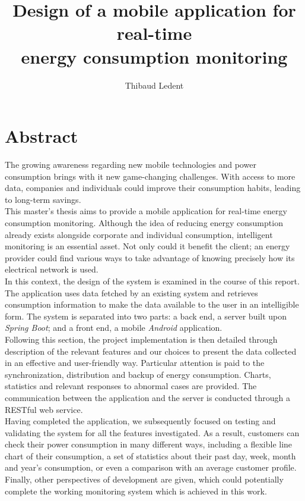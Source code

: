 \documentclass[a4paper, oneside, 11pt]{book}
\title{Design of a mobile application for real-time \\energy consumption monitoring}
\author{Thibaud Ledent}
\begin{document}
\maketitle

\frontmatter

\chapter{Abstract}
The growing awareness regarding new mobile technologies and power consumption brings with it new game-changing challenges. With access to more data, companies and individuals could improve their consumption habits, leading to long-term savings. \\

This master’s thesis aims to provide a mobile application for real-time energy consumption monitoring. Although the idea of reducing energy consumption already exists alongside corporate and individual consumption, intelligent monitoring is an essential asset. Not only could it benefit the client; an energy provider could find various ways to take advantage of knowing precisely how its electrical network is used.\\

In this context, the design of the system is examined in the course of this report. The application uses data fetched by an existing system and retrieves consumption information to make the data available to the user in an intelligible form. The system is separated into two parts: a back end, a server built upon \textit{Spring Boot}; and a front end, a mobile \textit{Android} application.\\

Following this section, the project implementation is then detailed through description of the relevant features and our choices to present the data collected in an effective and user-friendly way. Particular attention is paid to the synchronization, distribution and backup of energy consumption. Charts, statistics and relevant responses to abnormal cases are provided. The communication between the application and the server is conducted through a RESTful web service.\\

Having completed the application, we subsequently focused on testing and validating the system for all the features investigated. As a result, customers can check their power consumption in many different ways, including a flexible line chart of their consumption, a set of statistics about their past day, week, month and year’s consumption, or even a comparison with an average customer profile. Finally, other perspectives of development are given, which could potentially complete the working monitoring system which is achieved in this work. 
\end{document}
